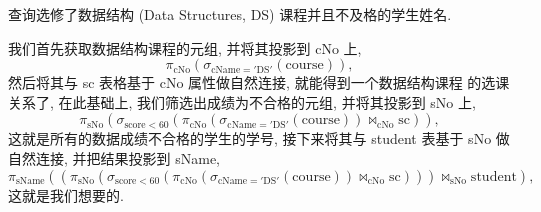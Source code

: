 \documentclass[10pt,UTF8]{book} %
\begin{document}
\begin{example}
    查询选修了数据结构 (Data Structures, DS) 课程并且不及格的学生姓名.
    \begin{sol}
        我们首先获取数据结构课程的元组, 并将其投影到 cNo 上,
        \[ \pi_\mathrm{cNo} \left(
            \sigma_\mathrm{cName = 'DS'}\left(
                \mathrm{course}
            \right)
        \right), \]
        然后将其与 sc 表格基于 cNo 属性做自然连接, 就能得到一个数据结构课程
        的选课关系了, 在此基础上, 我们筛选出成绩为不合格的元组,
        并将其投影到 sNo 上,
        \[ \pi_\mathrm{sNo}\left(\sigma_{\mathrm{score < 60}} \left(
            \pi_\mathrm{cNo} \left(
            \sigma_\mathrm{cName = 'DS'}\left(
                \mathrm{course}
            \right)
        \right)
        \Join_\mathrm{cNo} \mathrm{sc}
        \right)\right), \]
        这就是所有的数据成绩不合格的学生的学号,
        接下来将其与 student 表基于 sNo 做自然连接, 并把结果投影到 sName,
        \[ \pi_\mathrm{sName} \left(
            \left(\pi_\mathrm{sNo}\left(\sigma_{\mathrm{score < 60}} \left(
            \pi_\mathrm{cNo} \left(
            \sigma_\mathrm{cName = 'DS'}\left(
                \mathrm{course}
            \right)
        \right)
        \Join_\mathrm{cNo} \mathrm{sc}
        \right)\right)\right) \Join_\mathrm{sNo} \mathrm{student}
        \right), \]
        这就是我们想要的.
    \end{sol}
\end{example}
\end{document}
